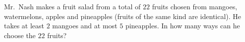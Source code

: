 Mr.\ Nash makes a fruit salad from a total of $22$ fruits chosen from mangoes, watermelons, apples and pineapples (fruits of the same kind are identical). He takes at least $2$ mangoes and at most $5$ pineapples. In how many ways can he choose the $22$ fruits?
